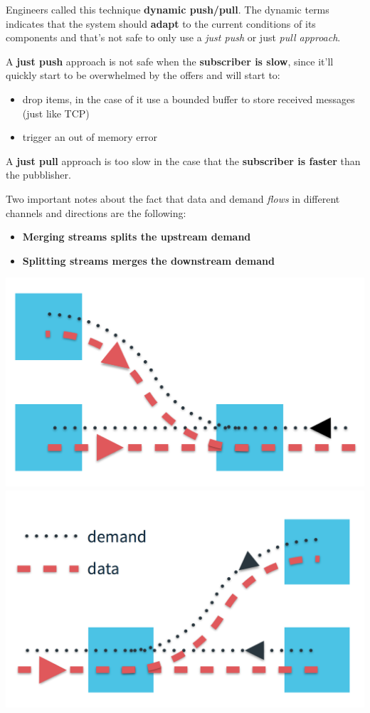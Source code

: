 Engineers called this technique \textbf{dynamic push/pull}. The dynamic
terms indicates that the system should \textbf{adapt} to the current
conditions of its components and that's not safe to only use a
\emph{just push} or just \emph{pull approach}.

A \textbf{just push} approach is not safe when the \textbf{subscriber is
slow}, since it'll quickly start to be overwhelmed by the offers and
will start to:

\begin{itemize}
\itemsep1pt\parskip0pt
\item
  drop items, in the case of it use a bounded buffer to store received
  messages (just like TCP)
\item
  trigger an out of memory error
\end{itemize}

A \textbf{just pull} approach is too slow in the case that the
\textbf{subscriber is faster} than the pubblisher.

Two important notes about the fact that data and demand \emph{flows} in
different channels and directions are the following:

\begin{itemize}
\itemsep1pt\parskip0pt
\item
  \textbf{Merging streams splits the upstream demand}
\item
  \textbf{Splitting streams merges the downstream demand}
\end{itemize}

\includegraphics[scale=0.25]{imgs/merge.png} 
\includegraphics[scale=0.25]{imgs/split.png}

